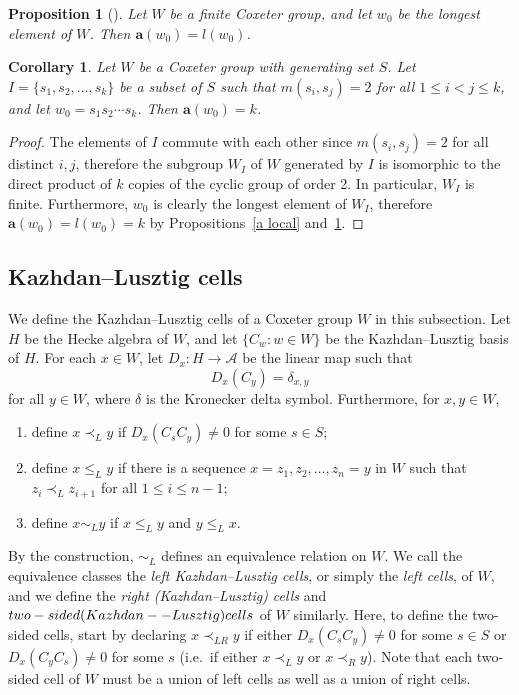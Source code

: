 \documentclass[10pt]{article}
\newtheorem{prop}[theorem]{Proposition}
\newtheorem{coro}[theorem]{Corollary}
\theoremstyle{definition}
\providecommand{\ie}{i.e.\ }
\newcommand{\cala}{\mathcal{A}}
\newcommand{\la}{\mathbf{a}}
\newcommand{\ra}{\rightarrow}
\begin{document}
\begin{prop}[{\cite[Proposition~13.8]{LG}}]
 \label{a for longest}
 Let $W$ be a finite Coxeter group, and let
 $w_0$ be the longest element of $W$. Then $\la(w_0)=l(w_0)$.
\end{prop}

\begin{coro}
 \label{product a}
 Let $W$ be a Coxeter group with generating set $S$. Let $I=\{s_1,s_2,\ldots,
 s_k\}$
 be a subset of $S$ such that $m(s_i,s_j)=2$ for all $1\le i<j\le k$, and let
 $w_0=s_1s_2\cdots s_k$. Then $\la(w_0)=k$.
\end{coro}
\begin{proof}
 The elements of $I$ commute with each other since $m(s_i,s_j)=2$
 for all distinct $i,j$, therefore the subgroup $W_I$ of $W$ generated by
 $I$ is isomorphic to the direct product of $k$ copies of the cyclic group of
 order 2. In particular, $W_I$ is finite. Furthermore, $w_0$ is clearly the
 longest element of $W_I$, therefore $\la(w_0)=l(w_0)=k$ by Propositions~\ref{a local} and~\ref{a for longest}.
\end{proof}


\subsection{Kazhdan--Lusztig cells}
We define the Kazhdan--Lusztig cells of a Coxeter group $W$ in this subsection. 
Let $H$ be the Hecke algebra of $W$, and let $\{C_w:w\in W\}$
be the Kazhdan--Lusztig basis of $H$. For each $x\in W$, let $D_x:H\ra \cala$
be the linear map such that 
\[
 D_{x}(C_y)=\delta_{x,y}
\]
for all $y\in W$, where $\delta$ is the Kronecker delta symbol. 
Furthermore, for $x,y\in W$,
\begin{enumerate}[leftmargin=2em]
 \item define $x\prec_L y$ if $D_{x}(C_sC_y)\neq 0$ for some
 $s\in S$;
 \item define $x\le_L y$ if there is a sequence $x=z_1,z_2,\ldots,z_n=y$ in
 $W$ such that $z_{i}\prec_L z_{i+1}$ for all $1\le i\le n-1$;
 \item define $x\sim_L y$ if $x\le_L y$ and $y\le_L x$.
\end{enumerate}
By the construction, $\sim_L$ defines an equivalence
relation on $W$. 
%
%
We call the equivalence classes the
\emph{left Kazhdan--Lusztig cells}, or simply the \emph{left cells}, of $W$,
and we define the \emph{right (Kazhdan--Lusztig) cells}
and $\emph{two-sided (Kazhdan--Lusztig) cells}$ of $W$ similarly. Here, to
define the two-sided cells, start by declaring $x\prec_{LR} y$ if either
$D_{x}(C_sC_y)\neq 0$ for some $s\in S$ or $D_x(C_yC_s)\neq 0$ for some $s$
(\ie if either $x\prec_L y$ or $x\prec_R y$).
Note that each two-sided cell of $W$ must be a union of left cells as well as a
union of right cells. 
\end{document}
